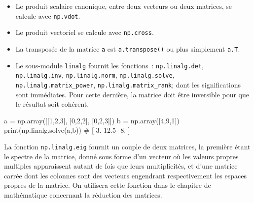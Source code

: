 \documentclass[10pt,fleqn]{article} %
\begin{document}
\begin{itemize}
\item Le produit scalaire canonique, entre deux vecteurs ou deux matrices,
se calcule avec \texttt{np.vdot}.
\item Le produit vectoriel se calcule avec \texttt{np.cross}.
\item La transposée de la matrice \texttt{a} est \texttt{a.transpose()} ou
plus simplement \texttt{a.T}.
\item Le sous-module \texttt{linalg} fournit les fonctions~:
  \texttt{np.linalg.det}, \texttt{np.linalg.inv},
  \texttt{np.linalg.norm}, \texttt{np.linalg.solve},\\
  \texttt{np.linalg.matrix\_power},
  \texttt{np.linalg.matrix\_rank};
dont les
significations sont immédiates. Pour cette dernière, la matrice doit
être inversible pour que le résultat soit cohérent.
\end{itemize}
\begin{multicols}{2}
\begin{python}
a = np.array([[1,2,3],
              [0,2,2],
              [0,2,3]])
b = np.array([4,9,1])
print(np.linalg.solve(a,b))
# [  3.   12.5  -8. ]  
\end{python}
\end{multicols}
 
La fonction \texttt{np.linalg.eig} fournit un couple de deux matrices,
la première étant le spectre de la matrice, donné sous forme d'un
vecteur où les valeurs propres multiples apparaissent autant de fois
que leurs multiplicités, et d'une matrice carrée dont les colonnes
sont des vecteurs engendrant respectivement les espaces propres de la
matrice. On utilisera cette fonction dans le chapitre de mathématique
concernant la réduction des matrices.
\end{document}
